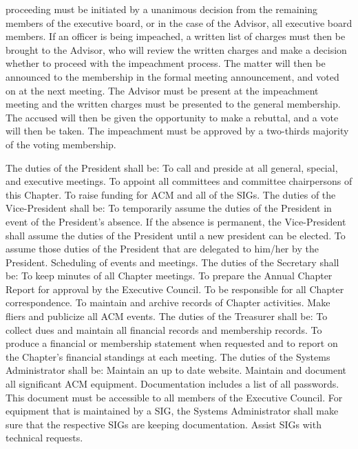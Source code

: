 \documentclass[11pt,a4paper,notitlepage]{article}
\begin{document}
proceeding must be initiated by a unanimous decision from the remaining members
of the executive board, or in the case of the Advisor, all executive board
members. If an officer is being impeached, a written list of charges must then
be brought to the Advisor, who will review the written charges and make a
decision whether to proceed with the impeachment process. The matter will then
be announced to the membership in the formal meeting announcement, and voted on
at the next meeting. The Advisor must be present at the impeachment meeting and
the written charges must be presented to the general membership. The accused
will then be given the opportunity to make a rebuttal, and a vote will then be
taken. The impeachment must be approved by a two-thirds majority of the voting
membership.







The duties of the President shall be: To call and preside at all general,
special, and executive meetings. To appoint all committees and committee
chairpersons of this Chapter. To raise funding for ACM and all of the SIGs. The
duties of the Vice-President shall be: To temporarily assume the duties of the
President in event of the President's absence. If the absence is permanent, the
Vice-President shall assume the duties of the President until a new president
can be elected. To assume those duties of the President that are delegated to
him/her by the President. Scheduling of events and meetings. The duties of the
Secretary shall be: To keep minutes of all Chapter meetings. To prepare the
Annual Chapter Report for approval by the Executive Council. To be responsible
for all Chapter correspondence. To maintain and archive records of Chapter
activities. Make fliers and publicize all ACM events. The duties of the
Treasurer shall be: To collect dues and maintain all financial records and
membership records. To produce a financial or membership statement when
requested and to report on the Chapter's financial standings at each meeting.
The duties of the Systems Administrator shall be: Maintain an up to date
website. Maintain and document all significant ACM equipment. Documentation
includes a list of all passwords. This document must be accessible to all
members of the Executive Council. For equipment that is maintained by a SIG, the
Systems Administrator shall make sure that the respective SIGs are keeping
documentation. Assist SIGs with technical requests.
\end{document}

